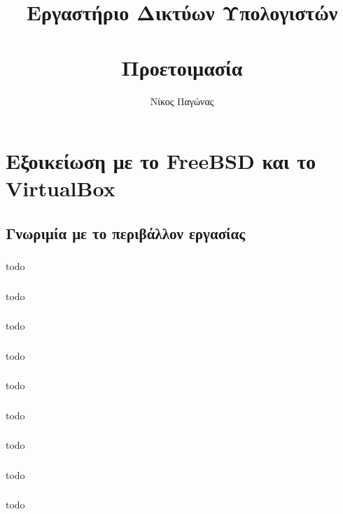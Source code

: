 \documentclass[a4paper, 12pt]{article}
\title{
	\textbf{Εργαστήριο Δικτύων Υπολογιστών} \\~\\
	Προετοιμασία
}
\author{Νίκος Παγώνας}
\date{}
\begin{document}
\maketitle

\section{Εξοικείωση με το FreeBSD και το VirtualBox}
	
	\subsection{Γνωριμία με το περιβάλλον εργασίας}
		\subsubsection{}
			todo

		\subsubsection{}
			todo

		\subsubsection{}
			todo

		\subsubsection{}
			todo

		\subsubsection{}
			todo

		\subsubsection{}
			todo

		\subsubsection{}
			todo

		\subsubsection{}
			todo

		\subsubsection{}
			todo
\end{document}
